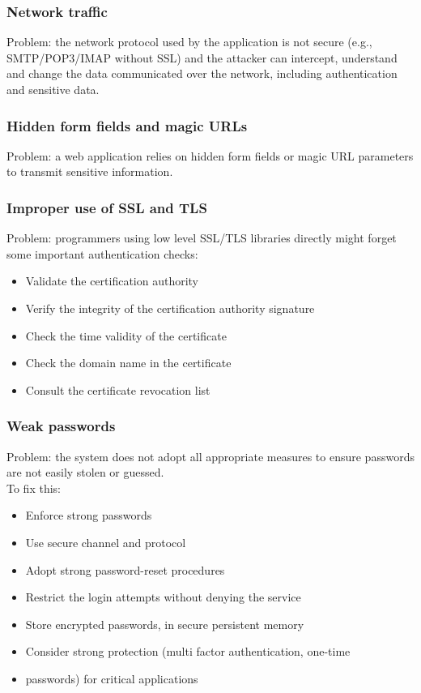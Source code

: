 \documentclass[a4paper, 10pt, titlepage]{article}
\begin{document}
\subsubsection*{Network traffic}
Problem: the network protocol used by the application is not secure (e.g., SMTP/POP3/IMAP without SSL) and the attacker can intercept, understand and change the data communicated over the network, including authentication and sensitive data.

\subsubsection*{Hidden form fields and magic URLs}
Problem: a web application relies on hidden form fields or magic URL parameters to transmit sensitive information.

\subsubsection*{Improper use of SSL and TLS}
Problem: programmers using low level SSL/TLS libraries directly might forget some important authentication checks:
\begin{itemize}
\item Validate the certification authority
\item Verify the integrity of the certification authority
signature
\item Check the time validity of the certificate
\item Check the domain name in the certificate
\item Consult the certificate revocation list
\end{itemize}

\subsubsection*{Weak passwords}
Problem: the system does not adopt all appropriate measures to ensure passwords are not easily stolen or guessed.\\
To fix this:
\begin{itemize}
\item Enforce strong passwords
\item Use secure channel and protocol
\item Adopt strong password-reset procedures
\item Restrict the login attempts without denying the service
\item Store encrypted passwords, in secure persistent memory
\item Consider strong protection (multi factor authentication, one-time
\item passwords) for critical applications
\end{itemize}
\end{document}
